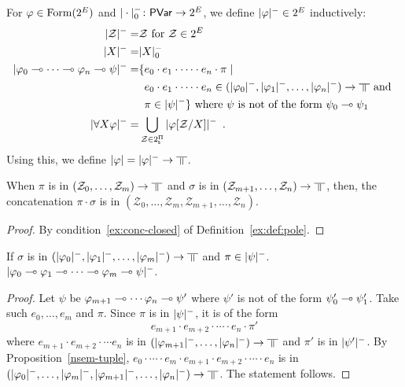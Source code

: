 For $\varphi\in\mathop{\text{Form}}(2^E)$ and $|\cdot|^-_0\colon\mathsf{PVar}\rightarrow 2^E$\kern
-2pt,
we define $|{\varphi}|^-\in
2^E$ inductively:
\begin{align*}
 \nsem{\mathcal Z} =& \mathcal Z \text{ for } \mathcal Z\in 2^E\\
 \nsem{X}=& |X|_0^- \\
 \nsem{\phi_0\limp\cdots\limp\phi_n\limp\psi}=&
 \{e_0\cdot e_1\cdot\cdots\cdot e_n\cdot\pi\mid \\ &\,\,\,  e_0\cdot
 e_1\cdot\cdots\cdot e_n
 \in(\nsem{\phi_0}, \nsem{\phi_1}, \ldots, \nsem{\phi_n})\rightarrow\bbot
 \text{ and  }
 \\&\,\,\,\pi\in\nsem\psi\}\text{ where }\psi\text{ is not of the form }\psi_0\limp\psi_1\\
 \nsem{\forall X\phi}=&
 \bigcup_{\mathcal Z\in 2^\sPi} \nsem{\phi[\mathcal Z/X]}\enspace.
\end{align*}
Using this, we define $\sem \phi=\nsem{\phi}\rightarrow\bbot$.
 \begin{proposition}
  \label{nsem-tuple}
  When $\pi$ is in
  $\left(\mathcal{Z}_0,\ldots,\mathcal{Z}_m\right)\rightarrow \bbot$
  and $\sigma$ is in
  $\left(\mathcal{Z}_{m+1},\ldots,\mathcal{Z}_n\right)\rightarrow \bbot$,
  then,
  the concatenation $\pi\cdot\sigma$ is in
  $\left(\mathcal{Z}_0,\ldots,\mathcal{Z}_m,
  \mathcal{Z}_{m+1},\ldots,\mathcal{Z}_n\right)$.
 \end{proposition}
  \begin{proof}
   By condition~\ref{ex:conc-closed} of Definition~\ref{ex:def:pole}.
  \end{proof}

 \begin{proposition}
  \label{nsem-imp}
  If $\sigma$ is in
  $(\nsem{\phi_0},\nsem{\phi_1},\ldots,\nsem{\phi_m})\rightarrow\bbot$
  and $\pi\in|{\psi}|^-$.
  $|{\varphi_0\multimap\varphi_1\multimap\cdots\multimap\varphi_m\multimap\psi}|^-$.
 \end{proposition}
  \begin{proof}
   Let $\psi$ be $\varphi_{m+1}\multimap\cdots\varphi_n\multimap\psi'$ where $\psi'$
   is not of the form $\psi'_0\multimap\psi'_1$.
   Take such $e_0,\ldots,e_m$ and $\pi$.
   Since $\pi$ is in $|{\psi}|^-$,
   it is of the form
   \[
    e_{m+1}\cdot e_{m+2}\cdot \cdots \cdot e_n\cdot \pi'
   \]
   where $e_{m+1}\cdot e_{m+2}\cdot \cdots e_n$ is in
   $(\nsem{\phi_{m+1}}, \ldots, \nsem{\phi_n})\rightarrow\bbot$
   and $\pi'$ is in $|{\psi'}|^-$.
   By Proposition~\ref{nsem-tuple},
   $ e_0\cdot\cdots\cdot e_m\cdot e_{m+1}\cdot e_{m+2}\cdot \cdots \cdot e_n $ is in
   $\left(\nsem{\phi_0},\ldots,\nsem{\phi_m},\nsem{\phi_{m+1}}, \ldots,
   \nsem{\phi_n}\right)\rightarrow \bbot$.  The statement follows.
  \end{proof}

